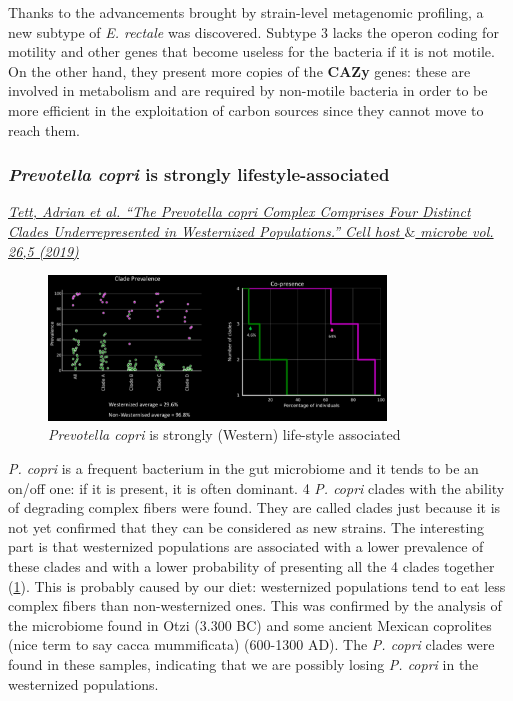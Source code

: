 Thanks to the advancements brought by strain-level metagenomic profiling, a new subtype of \emph{E. rectale} was discovered. Subtype 3 lacks the operon coding for motility and other genes that become useless for the bacteria if it is not motile. On the other hand, they present more copies of the \textbf{CAZy} genes: these are involved in metabolism and are required by non-motile bacteria in order to be more efficient in the exploitation of carbon sources since they cannot move to reach them.

\subsubsection{\emph{Prevotella copri} is strongly lifestyle-associated}

\href{https://www.sciencedirect.com/science/article/pii/S1931312819304275}{\emph{Tett, Adrian et al. “The Prevotella copri Complex Comprises Four Distinct Clades Underrepresented in Westernized Populations.” Cell host $\&$ microbe vol. 26,5 (2019)}}\\

\begin{figure}[!h]
\centering
\includegraphics[width=0.8\textwidth]{Prevotella.png}
\caption{\label{fig:prevotella}\emph{Prevotella copri} is strongly (Western) life-style associated}
\end{figure}

\emph{P. copri} is a frequent bacterium in the gut microbiome and it tends to be an on/off one: if it is present, it is often dominant.
4 \emph{P. copri} clades with the ability of degrading complex fibers were found. They are called clades just because it is not yet confirmed that they can be considered as new strains. 
The interesting part is that westernized populations are associated with a lower prevalence of these clades and with a lower probability of presenting all the 4 clades together (\ref{fig:prevotella}). This is probably caused by our diet: westernized populations tend to eat less complex fibers than non-westernized ones.
This was confirmed by the analysis of the microbiome found in Otzi (3.300 BC) and some ancient Mexican coprolites (nice term to say cacca mummificata) (600-1300 AD). The \emph{P. copri} clades were found in these samples, indicating that we are possibly losing \emph{P. copri} in the westernized populations.

